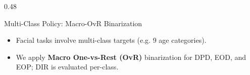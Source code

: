 \begin{frame}
\begin{columns}[T]
    \begin{column}{0.48\textwidth}
      \begin{card}{Multi-Class Policy: Macro-OvR Binarization}
        \scriptsize
        \begin{itemize}
          \item Facial tasks involve multi-class targets (e.g. 9 age categories).
          \item We apply \textbf{Macro One-vs-Rest (OvR)} binarization for DPD, EOD, and EOP; DIR is evaluated per-class.
        \end{itemize}
      \end{card}
    \end{column}
  \end{columns}
\end{frame}
